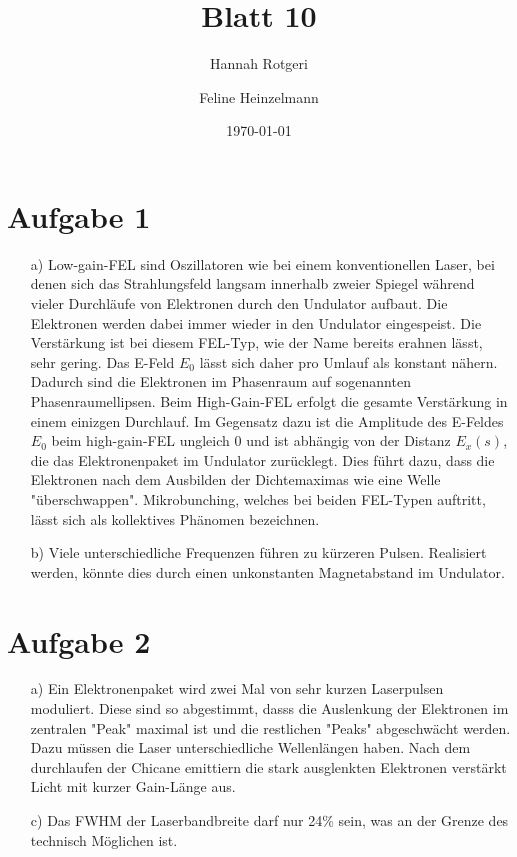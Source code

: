 \documentclass[11pt,a4paper]{article}
\title{Blatt 10}
\date{\today}
\author{Hannah Rotgeri \and Feline Heinzelmann}
\begin{document}
    \maketitle

    \section*{Aufgabe 1}
	\begin{itemize}
		\item[a)] 
			Low-gain-FEL sind Oszillatoren wie bei einem konventionellen Laser, bei denen sich das Strahlungsfeld langsam innerhalb zweier Spiegel während vieler 
			Durchläufe von Elektronen durch den Undulator aufbaut. Die Elektronen werden dabei immer wieder in den Undulator eingespeist. 
			Die Verstärkung ist bei diesem FEL-Typ, wie der Name bereits erahnen lässt, sehr gering. 
            Das E-Feld $E_0$ lässt sich daher pro Umlauf als konstant nähern.
			Dadurch sind die Elektronen im Phasenraum auf sogenannten Phasenraumellipsen.
			Beim High-Gain-FEL erfolgt die gesamte Verstärkung in einem einizgen Durchlauf.
			Im Gegensatz dazu ist die Amplitude des E-Feldes $E_0$ beim high-gain-FEL ungleich 0 und ist abhängig von der Distanz $E_{x}(s)$, die das 
			Elektronenpaket im Undulator zurücklegt.
			Dies führt dazu, dass die Elektronen nach dem Ausbilden der Dichtemaximas wie eine Welle "überschwappen".
			Mikrobunching, welches bei beiden FEL-Typen auftritt, lässt sich als kollektives Phänomen bezeichnen.

		\item[b)]
			Viele unterschiedliche Frequenzen führen zu kürzeren Pulsen. 
			Realisiert werden, könnte dies durch einen unkonstanten Magnetabstand im Undulator.

	\end{itemize}


	
    \section*{Aufgabe 2}
	\begin{itemize}
		\item[a)] 
			Ein Elektronenpaket wird zwei Mal von sehr kurzen Laserpulsen moduliert.
			Diese sind so abgestimmt, dasss die Auslenkung der Elektronen im zentralen "Peak" maximal ist
			und die restlichen "Peaks" abgeschwächt werden.
			Dazu müssen die Laser unterschiedliche Wellenlängen haben.
			Nach dem durchlaufen der Chicane emittiern die stark ausglenkten Elektronen verstärkt Licht mit kurzer Gain-Länge aus.
		\item[c)]
			Das FWHM der Laserbandbreite darf nur 24\% sein, was an der Grenze des technisch Möglichen ist.
	\end{itemize}
\end{document}
